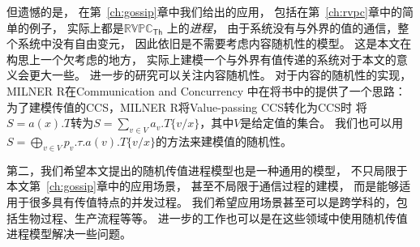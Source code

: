 但遗憾的是，
在第~\ref{ch:gossip}章中我们给出的应用，
包括在第~\ref{ch:rvpc}章中的简单的例子，
实际上都是$\mathbb{RVPC}_{\mathsf{Th}}$
上的\textit{进程}，
由于系统没有与外界的值的通信，整个系统中没有自由变元，
因此依旧是不需要考虑内容随机性的模型。
这是本文在构思上一个欠考虑的地方，
实际上建模一个与外界有值传递的系统对于本文的意义会更大一些。
进一步的研究可以关注内容随机性。
对于内容的随机性的实现，MILNER R在Communication and Concurrency\cite{Milner_CCS}
中在将书中的提供了一个思路：
为了建模传值的CCS，MILNER R将Value-passing CCS转化为CCS时
将$S=a(x).T$转为$S=\sum_{v\in V} a_v.T\{v/x\}$，其中$V$是给定值的集合。
我们也可以用$S=\bigoplus_{v\in V}p_v.\tau.a(v).T\{v/x\}$的方法来建模值的随机性。

第二，我们希望本文提出的随机传值进程模型也是一种通用的模型，
不只局限于本文第~\ref{ch:gossip}章中的应用场景，
甚至不局限于通信过程的建模，
而是能够适用于很多具有传值特点的并发过程。
我们希望应用场景甚至可以是跨学科的，包括生物过程、生产流程等等。
进一步的工作也可以是在这些领域中使用随机传值进程模型解决一些问题。